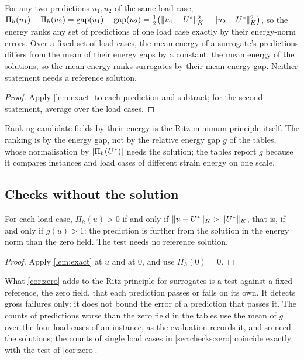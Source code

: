 \begin{corollary}\label{cor:rank}
For any two predictions $u_1,u_2$ of the same load case,
$\Pi_h(u_1)-\Pi_h(u_2)=\operatorname{gap}(u_1)-\operatorname{gap}(u_2)
=\tfrac12\bigl(\lVert u_1-U^{\ast}\rVert_K^2-\lVert u_2-U^{\ast}\rVert_K^2\bigr)$, so the energy ranks
any set of predictions of one load case exactly by their energy-norm errors. Over a
fixed set of load cases, the mean energy of a surrogate's predictions differs from the mean
of their energy gaps by a constant, the mean energy of the solutions, so the mean energy
ranks surrogates by their mean energy gap. Neither statement needs a reference solution.
\end{corollary}

\begin{proof}
Apply \cref{lem:exact} to each prediction and subtract; for the second statement, average
over the load cases.
\end{proof}

Ranking candidate fields by their energy is the Ritz minimum principle itself. The ranking
is by the energy gap, not by the relative energy gap $g$ of the tables, whose normalisation
by $\lvert\Pi_h(U^{\ast})\rvert$ needs the solution; the tables report $g$ because it compares
instances and load cases of different strain energy on one scale.

\subsection{Checks without the solution}\label{sec:theory:detector}

\begin{corollary}\label{cor:zero}
For each load case, $\Pi_h(u)>0$ if and only if $\lVert u-U^{\ast}\rVert_K>\lVert U^{\ast}\rVert_K$, that
is, if and only if $g(u)>1$: the prediction is further from the solution in the energy
norm than the zero field. The test needs no reference solution.
\end{corollary}

\begin{proof}
Apply \cref{lem:exact} at $u$ and at $0$, and use $\Pi_h(0)=0$.
\end{proof}

What \cref{cor:zero} adds to the Ritz principle for surrogates is a test against a fixed
reference, the zero field, that each prediction passes or fails on its own. It detects
gross failures only: it does not bound the error of a prediction that passes it. The counts
of predictions worse than the zero field in the tables use the mean of $g$ over the four
load cases of an instance, as the evaluation records it, and so need the solutions; the
counts of single load cases in \cref{sec:checks:zero} coincide exactly with the test of
\cref{cor:zero}.


